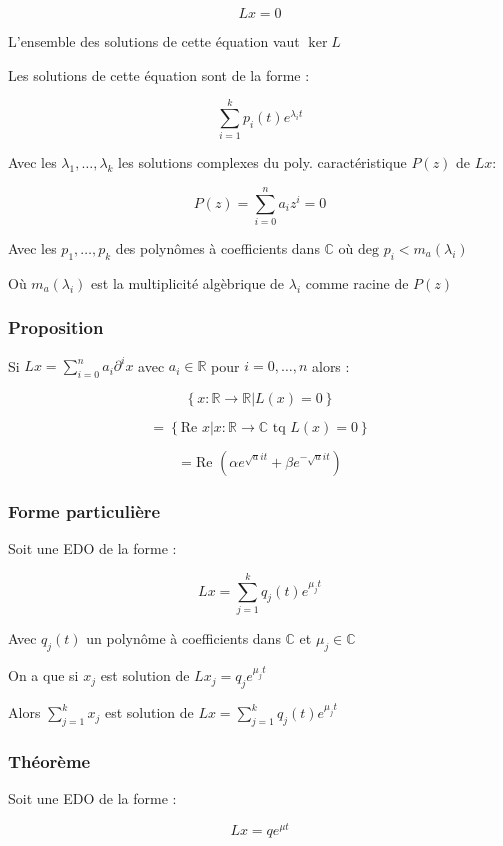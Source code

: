 \documentclass[a4paper,10pt]{article}
\newcommand{\ap}{\rightarrow}
\newcommand{\R}{\mathbb{R}}
\newcommand{\C}{\mathbb{C}}
\newcommand{\tset}[1]{\left\lbrace #1 \right\rbrace}
\newcommand{\eqdo}{EDO }
\begin{document}
$$Lx = 0$$

L'ensemble des solutions de cette équation vaut $\ker L$

Les solutions de cette équation sont de la forme :

$$\sum_{i=1}^k p_i(t) e^{\lambda_i t}$$

Avec les $\lambda_1, \dots, \lambda_k$ les solutions complexes du poly. caractéristique $P(z)$ de $Lx$:

$$P(z) = \sum_{i=0}^n a_i z^i = 0$$

Avec les $p_1,\dots,p_k$ des polynômes à coefficients dans $\C$ où $\mbox{deg } p_i < m_a(\lambda_i)$ 

Où $m_a(\lambda_i)$ est la multiplicité algèbrique de $\lambda_i$ comme racine de $P(z)$ 


\subsubsection{Proposition}

Si $Lx = \sum_{i=0}^n a_i \partial^i x$ avec $a_i \in \R$ pour $i = 0,\dots,n$ alors :

$$\tset{x:\R \ap \R \vert L(x) = 0}$$

$$ = \tset{\mbox{Re } x \vert x : \R \ap \C \mbox{ tq } L(x) = 0}$$

$$ = \mbox{Re }(\alpha e^{\sqrt{a} i t} + \beta e^{- \sqrt{a} i t})$$

\subsubsection{Forme particulière}

Soit une \eqdo de la forme :

$$Lx = \sum_{j=1}^k q_j(t) e^{\mu_j t}$$

Avec $q_j(t)$ un polynôme à coefficients dans $\C$ et $\mu_j \in \C$

On a que si $x_j$ est solution de $Lx_j = q_j e^{\mu_j t}$

Alors $\sum_{j=1}^k x_j$ est solution de $Lx = \sum_{j=1}^k q_j(t) e^{\mu_j t}$

\subsubsection{Théorème}

Soit une \eqdo de la forme :

$$Lx = q e^{\mu t}$$
\end{document}
